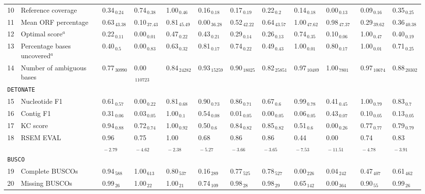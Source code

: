 \documentclass{scrartcl}
\begin{document}
\begin{landscape}
\begin{table}
\begin{scriptsize}
\begin{tabular}{llllllllllll}
10 & Reference coverage  & 0.34$_{\,0.24}$ & 0.74$_{\,0.38}$ & 1.00$_{\,0.46}$ & 0.16$_{\,0.18}$ & 0.17$_{\,0.19}$ & 0.22$_{\,0.2}$ & 0.14$_{\,0.18}$ & 0.00$_{\,0.13}$ & 0.09$_{\,0.16}$ & 0.35$_{\,0.25}$ \\11 & Mean ORF percentage  & 0.63$_{\,43.38}$ & 0.10$_{\,37.43}$ & 0.81$_{\,45.49}$ & 0.00$_{\,36.28}$ & 0.52$_{\,42.22}$ & 0.64$_{\,43.57}$ & 1.00$_{\,47.62}$ & 0.98$_{\,47.37}$ & 0.29$_{\,39.62}$ & 0.36$_{\,40.38}$ \\12 & Optimal score$^{a}$  & 0.22$_{\,0.11}$ & 0.00$_{\,0.01}$ & 0.47$_{\,0.22}$ & 0.43$_{\,0.21}$ & 0.29$_{\,0.14}$ & 0.26$_{\,0.13}$ & 0.74$_{\,0.35}$ & 0.10$_{\,0.06}$ & 1.00$_{\,0.47}$ & 0.40$_{\,0.19}$ \\13 & Percentage bases uncovered$^{a}$  & 0.40$_{\,0.5}$ & 0.00$_{\,0.83}$ & 0.63$_{\,0.32}$ & 0.81$_{\,0.17}$ & 0.74$_{\,0.22}$ & 0.49$_{\,0.43}$ & 1.00$_{\,0.01}$ & 0.80$_{\,0.17}$ & 1.00$_{\,0.01}$ & 0.71$_{\,0.25}$ \\14 & Number of ambiguous bases  & 0.77$_{\,30990}$ & 0.00$_{\,110723}$ & 0.84$_{\,24282}$ & 0.93$_{\,15259}$ & 0.90$_{\,18025}$ & 0.82$_{\,25851}$ & 0.97$_{\,10489}$ & 1.00$_{\,7801}$ & 0.97$_{\,10674}$ & 0.88$_{\,20302}$ \\\midrule
\multicolumn{11}{l}{\texttt{DETONATE}}\\ 
\midrule
15 & Nucleotide F1  & 0.61$_{\,0.57}$ & 0.00$_{\,0.22}$ & 0.81$_{\,0.68}$ & 0.90$_{\,0.73}$ & 0.86$_{\,0.71}$ & 0.67$_{\,0.6}$ & 0.99$_{\,0.78}$ & 0.41$_{\,0.45}$ & 1.00$_{\,0.79}$ & 0.83$_{\,0.7}$ \\16 & Contig F1  & 0.31$_{\,0.06}$ & 0.03$_{\,0.05}$ & 1.00$_{\,0.1}$ & 0.54$_{\,0.08}$ & 0.01$_{\,0.05}$ & 0.00$_{\,0.05}$ & 0.06$_{\,0.05}$ & 0.43$_{\,0.07}$ & 0.10$_{\,0.05}$ & 0.13$_{\,0.05}$ \\17 & KC score  & 0.94$_{\,0.88}$ & 0.72$_{\,0.74}$ & 1.00$_{\,0.92}$ & 0.50$_{\,0.6}$ & 0.84$_{\,0.82}$ & 0.85$_{\,0.82}$ & 0.51$_{\,0.6}$ & 0.00$_{\,0.26}$ & 0.77$_{\,0.77}$ & 0.79$_{\,0.79}$ \\18 & RSEM EVAL  & 0.96$_{\,-2.79}$ & 0.75$_{\,-4.62}$ & 1.00$_{\,-2.38}$ & 0.68$_{\,-5.27}$ & 0.86$_{\,-3.66}$ & 0.86$_{\,-3.65}$ & 0.44$_{\,-7.53}$ & 0.00$_{\,-11.51}$ & 0.74$_{\,-4.78}$ & 0.83$_{\,-3.91}$ \\\midrule
\multicolumn{11}{l}{\texttt{BUSCO}}\\ 
\midrule
19 & Complete BUSCOs  & 0.94$_{\,588}$ & 1.00$_{\,613}$ & 0.80$_{\,537}$ & 0.16$_{\,289}$ & 0.77$_{\,525}$ & 0.78$_{\,527}$ & 0.00$_{\,226}$ & 0.04$_{\,242}$ & 0.47$_{\,407}$ & 0.61$_{\,462}$ \\20 & Missing BUSCOs  & 0.99$_{\,26}$ & 1.00$_{\,22}$ & 1.00$_{\,21}$ & 0.74$_{\,109}$ & 0.98$_{\,28}$ & 0.98$_{\,29}$ & 0.65$_{\,142}$ & 0.00$_{\,364}$ & 0.90$_{\,55}$ & 0.99$_{\,26}$ \\\midrule

\end{tabular}
\end{scriptsize}
\end{table}
\end{landscape}
\end{document}
